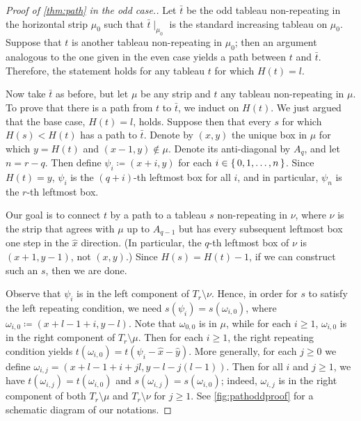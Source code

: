 \documentclass[11pt,reqno]{amsart}
\newcommand*{\restrict}[1]{{\mid}_{#1}}
\theoremstyle{definition}
\theoremstyle{problem}
\theoremstyle{plain}
\theoremstyle{remark}
\theoremstyle{theorem}
\numberwithin{equation}{section}
\numberwithin{figure}{section}
\begin{document}
\begin{proof}[Proof of \cref{thm:path} in the odd case.]
  Let $\bar{t}$ be the odd tableau non-repeating in the horizontal
  strip $\mu_0$ such that $\bar{t}\restrict{\mu_0}$ is the standard
  increasing tableau on $\mu_0$.  Suppose that $t$ is another tableau
  non-repeating in $\mu_0$; then an argument analogous to the one
  given in the even case yields a path between $t$ and $\bar{t}$.
  Therefore, the statement holds for any tableau $t$ for which
  $H(t) = l$.

  Now take $\bar{t}$ as before, but let $\mu$ be any strip and $t$ any
  tableau non-repeating in $\mu$.  To prove that there is a path from
  $t$ to $\bar{t}$, we induct on $H(t)$.  We just argued that the base
  case, $H(t) = l$, holds.  Suppose then that every $s$ for which
  $H(s) < H(t)$ has a path to $\bar{t}$.  Denote by $(x,y)$ the
  unique box in $\mu$ for which $y = H(t)$ and $(x-1,y) \nin \mu$.
  Denote its anti-diagonal by $A_q$, and let $n = r - q$.  Then define
  $\psi_i \coloneq (x+i,y)$ for each $i \in \set{0,1,\ldots,n}$.
  Since $H(t) = y$, $\psi_i$ is the $(q + i)$-th leftmost box for all
  $i$, and in particular, $\psi_n$ is the $r$-th leftmost box.

  Our goal is to connect $t$ by a path to a tableau $s$ non-repeating
  in $\nu$, where $\nu$ is the strip that agrees with $\mu$ up to
  $A_{q-1}$ but has every subsequent leftmost box one step in the
  $\hat x$ direction.  (In particular, the $q$-th leftmost box of
  $\nu$ is $(x+1,y-1)$, not $(x,y)$.)  Since $H(s) = H(t) - 1$, if we
  can construct such an $s$, then we are done.

  Observe that $\psi_i$ is in the left component of
  $T_r \setminus \nu$.  Hence, in order for $s$ to satisfy the left
  repeating condition, we need $s(\psi_i) = s(\omega_{i,0})$, where
  $\omega_{i,0} \coloneq (x+l-1+i,y-l)$.  Note that $\omega_{0,0}$ is
  in $\mu$, while for each $i \geq 1$, $\omega_{i,0}$ is in the right
  component of $T_r \setminus \mu$.  Then for each $i \geq 1$, the
  right repeating condition yields
  $t(\omega_{i,0}) = t(\psi_i - \hat x - \hat y)$.  More generally,
  for each $j \geq 0$ we define
  $\omega_{i,j} = (x+l-1+i+jl,y-l-j(l-1))$.  Then for all $i$ and
  $j \geq 1$, we have $t(\omega_{i,j}) = t(\omega_{i,0})$ and
  $s(\omega_{i,j}) = s(\omega_{i,0})$; indeed, $\omega_{i,j}$ is in
  the right component of both $T_r \setminus \mu$ and
  $T_r \setminus \nu$ for $j \geq 1$.  See \cref{fig:pathoddproof} for
  a schematic diagram of our notations.


\end{proof}
\end{document}

